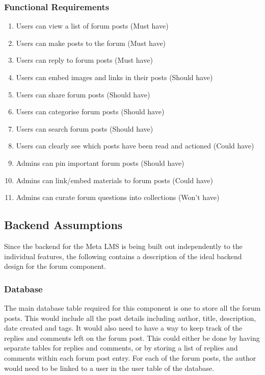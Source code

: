 \subsubsection{Functional Requirements}
\begin{enumerate}
    \item Users can view a list of forum posts (Must have)
    \item Users can make posts to the forum (Must have)
    \item Users can reply to forum posts (Must have)
    \item Users can embed images and links in their posts (Should have)
    \item Users can share forum posts (Should have)
    \item Users can categorise forum posts (Should have)
    \item Users can search forum posts (Should have)
    \item Users can clearly see which posts have been read and actioned (Could have)
    \item Admins can pin important forum posts (Should have)
    \item Admins can link/embed materials to forum posts (Could have)
    \item Admins can curate forum questions into collections (Won't have)
\end{enumerate}

\newpage

\subsection{Backend Assumptions}
Since the backend for the Meta LMS is being built out independently to the individual features, the following contains a description of the ideal backend design for the forum component.

\subsubsection{Database}
The main database table required for this component is one to store all the forum posts.
This would include all the post details including author, title, description, date created and tags.
It would also need to have a way to keep track of the replies and comments left on the forum post.
This could either be done by having separate tables for replies and comments, or by storing a list of replies and comments within each forum post entry.
For each of the forum posts, the author would need to be linked to a user in the user table of the database.

